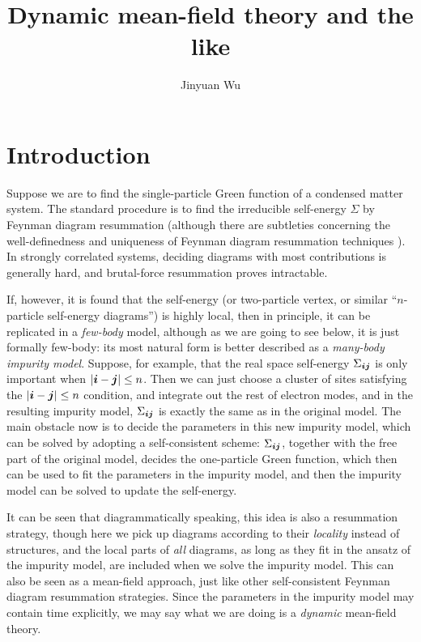 \documentclass[hyperref, a4paper]{article}
\title{Dynamic mean-field theory and the like}
\author{Jinyuan Wu}
\begin{document}
    
\maketitle

\section{Introduction}

Suppose we are to find the single-particle Green function 
of a condensed matter system.
The standard procedure is to find the irreducible self-energy $\Sigma$
by Feynman diagram resummation
(although there are subtleties 
concerning the well-definedness and uniqueness of Feynman diagram resummation techniques 
\cite{PhysRevLett.119.056402}).
In strongly correlated systems,
deciding diagrams with most contributions is generally hard,
and brutal-force resummation proves intractable.

If, however, it is found that the self-energy 
(or two-particle vertex, or similar ``$n$-particle self-energy diagrams'')
is highly local, 
then in principle,
it can be replicated in a \emph{few-body} model,
although as we are going to see below,
it is just formally few-body:
its most natural form is better described as a \emph{many-body impurity model}.
Suppose, for example, that the real space self-energy $\Sigma_{\vb*{i} \vb*{j}}$ is only important 
when $\abs{\vb*{i} - \vb*{j}} \leq n$.
Then we can just choose a cluster of sites satisfying the $\abs{\vb*{i} - \vb*{j}} \leq n$ condition,
and integrate out the rest of electron modes,
and in the resulting impurity model,
$\Sigma_{\vb*{i} \vb*{j}}$ is exactly the same as in the original model.
The main obstacle now is to decide the parameters in this new impurity model,
which can be solved by adopting a self-consistent scheme:
$\Sigma_{\vb*{i} \vb*{j}}$, together with the free part of the original model,
decides the one-particle Green function,
which then can be used to fit the parameters in the impurity model,
and then the impurity model can be solved to update the self-energy.

It can be seen that diagrammatically speaking, 
this idea is also a resummation strategy,
though here we pick up diagrams according to their \emph{locality} instead of structures,
and the local parts of \emph{all} diagrams, 
as long as they fit in the ansatz of the impurity model,
are included when we solve the impurity model.
This can also be seen as a mean-field approach,
just like other self-consistent Feynman diagram resummation strategies.
Since the parameters in the impurity model may contain time explicitly,
we may say what we are doing is a \emph{dynamic} mean-field theory.
\end{document}
